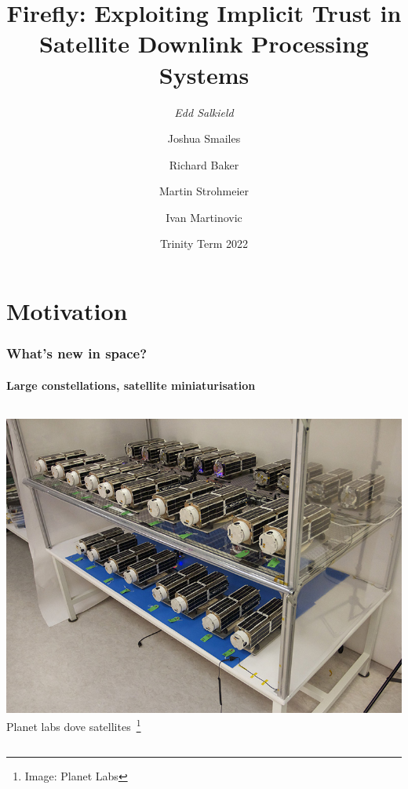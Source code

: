 \documentclass{beamer}
\begin{document}
\title[Exploiting Implicit Trust in Satellite Downlink Processing Systems]{Firefly: Exploiting Implicit Trust in Satellite Downlink Processing Systems}
\author[Edd Salkield]{
  \emph{Edd Salkield}
  \and
  Joshua Smailes
  \and
  Richard Baker
  \and
  Martin Strohmeier
  \and
  Ivan Martinovic
}
\date{Trinity Term 2022}

\makeoxfordtitle

\section{Motivation}

\begin{frame}
  \frametitle{What's new in space?}
  \framesubtitle{Large constellations, satellite miniaturisation}
  \begin{columns}[t]
    \begin{column}{5cm}
      \centering
      \includegraphics[width=\columnwidth]{images/planetlabs_satellites.jpg}
      \newline
      Planet labs dove satellites~\footnote[frame]{Image: Planet Labs}
    \end{column}


\end{columns}
\end{frame}
\end{document}
